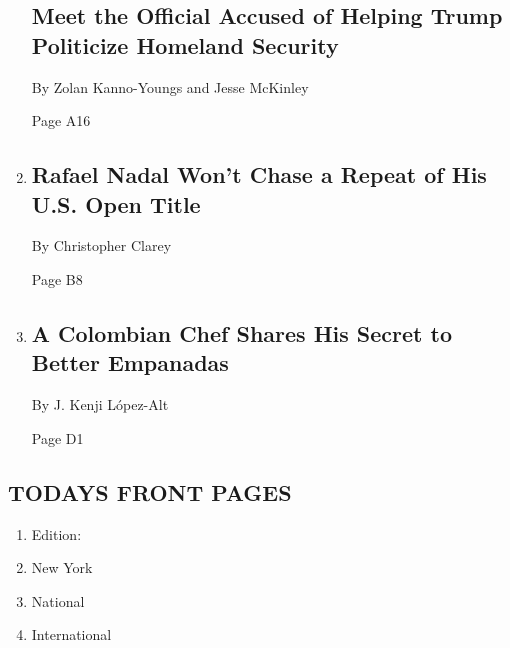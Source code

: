 \begin{enumerate}
{  \subsection{Meet the Official Accused of Helping Trump Politicize
  Homeland
  Security}\label{meet-the-official-accused-of-helping-trump-politicize-homeland-security}}

  By Zolan Kanno-Youngs and Jesse McKinley

  Page A16
\item
  \href{/2020/08/04/sports/tennis/rafael-nadal-us-open.html}{}

  \hypertarget{rafael-nadal-wont-chase-a-repeat-of-his-us-open-title}{%
  \subsection{Rafael Nadal Won't Chase a Repeat of His U.S. Open
  Title}\label{rafael-nadal-wont-chase-a-repeat-of-his-us-open-title}}

  By Christopher Clarey

  Page B8
\item
  \href{/2020/08/04/dining/colombian-empanadas-carlos-gaviria.html}{}

  \hypertarget{a-colombian-chef-shares-his-secret-to-better-empanadas}{%
  \subsection{A Colombian Chef Shares His Secret to Better
  Empanadas}\label{a-colombian-chef-shares-his-secret-to-better-empanadas}}

  By J. Kenji López-Alt

  Page D1
\end{enumerate}

\hypertarget{todays-front-pages}{%
\subsection{TODAYS FRONT PAGES}\label{todays-front-pages}}

\begin{enumerate}
\def\labelenumi{\arabic{enumi}.}
\tightlist
\item
  Edition:
\item
  New York
\item
  National
\item
  International
\end{enumerate}

\href{http://app.nytimes3xbfgragh.onion/todayspaper}{}

